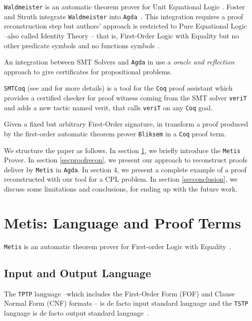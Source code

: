 \documentclass[runningheads,a4paper]{llncs}
\begin{document}
\verb!Waldmeister! is an automatic theorem prover for Unit Equational Logic \cite{hillenbrand1997}. Foster and Struth \cite{foster2011integrating} integrate \verb!Waldmeister! into \verb!Agda!~\cite{agdateam}. This integration requires a proof reconstruction step but authors' approach is restricted to Pure Equational Logic --also called Identity Theory \cite{humberstone2011}-- that is, First-Order Logic with Equality but no other predicate symbols and no functions symbols \cite{appel1959}.

An integration between SMT Solvers and \verb!Agda! in \cite{kanso2016light} use a \emph{oracle and reflection} approach to give certificates for propositional problems.

\verb!SMTCoq! (see \cite{armand2011} and \cite{Ekici2017} for more details) is a tool for the \verb!Coq! proof assistant \cite{coqteam} which provides a certified checker for proof witness coming from the SMT solver \verb!veriT! \cite{bouton2009} and adds a new tactic named verit, that calls \verb!veriT! on any \verb!Coq! goal.

Given a fixed but arbitrary First-Order signature, in \cite{bezem2002automated} transform a proof produced by the first-order automatic theorem prover \verb!Bliksem! \cite{deNivelle2003} in a \verb!Coq! proof term.

We structure the paper as follows. In section \ref{sec2}, we briefly introduce the \verb!Metis! Prover. In section \ref{secproofrecon}, we present our approach to reconstruct proofs deliver by \verb!Metis! in \verb!Agda!. In section 4, we present a complete example of a proof reconstructed with our tool for a CPL problem. In section \ref{secconclusion}, we discuss some limitations and conclusions, for ending up with the future work.

\section{Metis: Language and Proof Terms}\label{sec2}
\verb!Metis! is an automatic theorem prover for First-order Logic with Equality~\cite{hurd2003first}.

\subsection{Input and Output Language}
The \verb!TPTP! language --which includes the First-Order Form (FOF) and Clause Normal Form (CNF) formats \cite{sutcliffe2009} -- is de facto input standard language and the \verb!TSTP! language is de facto output standard language~\cite{sutcliffe2004tstp}.
\end{document}

